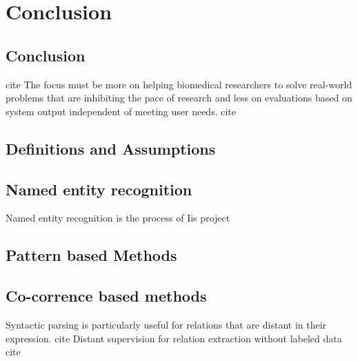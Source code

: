 \chapter{Conclusion}  %

\ifpdf
    \graphicspath{{Conclusion/Figs/Raster/}{Conclusion/Figs/PDF/}{Conclusion/Figs/}}
\else
    \graphicspath{{Conclusion/Figs/Vector/}{Conclusion/Figs/}}
\fi

\section{Conclusion} %
 cite The focus must be more on helping biomedical researchers to solve real-world problems that are inhibiting the pace of research and less on evaluations based on system output independent of meeting user needs. cite

\section{Definitions and Assumptions}


\section{Named entity recognition}
Named entity recognition is the process of 
Iis project 

\section{Pattern based Methods}

\section{Co-corrence based methods}
Syntactic parsing is particularly useful for relations that are distant in their expression. cite Distant supervision for relation extraction without labeled data cite

